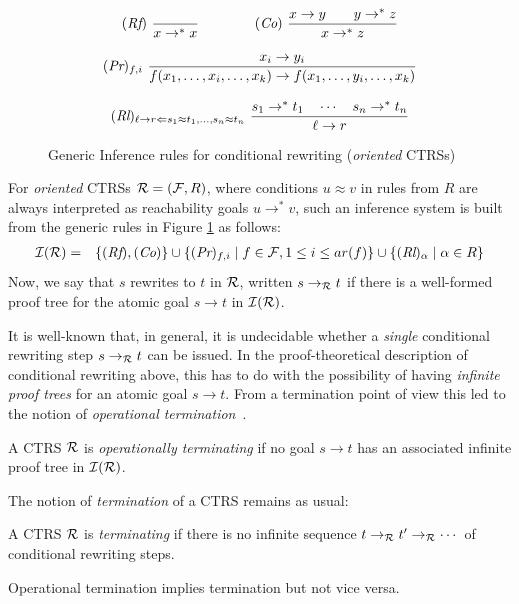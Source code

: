 %
\begin{figure}[t]
\begin{gather*}
(\emph{Rf})\ \frac{}{x \rightarrow^{\ast} x}
\qquad\qquad
(\emph{Co})\ \frac{x \rightarrow y\qquad y \rightarrow^{*} z}{x \rightarrow^{*} z}
\\[0.3cm]
(\emph{Pr})_{f,i}\ \frac{x_i \rightarrow y_i}{f(x_{1},\ldots,x_{i},\ldots,x_{k})\rightarrow f(x_{1},\ldots,y_{i},\ldots,x_{k})}
\\[0.3cm]
(\emph{Rl})_{\ell \to r \Leftarrow s_1\approx t_1,\ldots,s_n\approx t_n}\ \frac{s_1\to^*t_1\quad \cdots \quad s_n\to^*t_n}{\ell \rightarrow r}
\end{gather*}
\caption{Generic Inference rules for conditional rewriting (\emph{oriented} CTRSs)}
\label{FigInferenceRulesForConditionalRewriting}
\end{figure}
%
For \emph{oriented} CTRSs ${\cal R}=({\cal F},R)$, where conditions $u\approx v$ in rules from $R$ are always interpreted as reachability goals $u\to^*v$, such an inference system is built from the generic rules in Figure \ref{FigInferenceRulesForConditionalRewriting} as follows:
\begin{eqnarray*}
{\cal I}({\cal R}) & = & \{(\emph{Rf}),(\emph{Co})\}\cup\{(\emph{Pr})_{f,i}\mid f\in{\cal F}, 1\leq i\leq ar(f)\}\cup\{(\emph{Rl})_\alpha\mid\alpha\in R\}
\end{eqnarray*}
%
Now, we say that $s$ rewrites to $t$ in ${\cal R}$, written $s\to_{\cal R}t$ if there is a well-formed proof tree for the atomic goal $s\to t$ in 
${\cal I}({\cal R})$.

It is well-known that,  in general, it is undecidable whether a \emph{single} conditional rewriting step $s\to_{\cal R} t$ can be issued.
%
In the proof-theoretical description of conditional rewriting above, this has to do with the possibility of having \emph{infinite proof trees} for an atomic goal $s\to t$.
%
From a termination point of view this led to the notion of \emph{operational termination}~\cite{lucas2005OperationalTerminationConditional}. 
%
\begin{definition}
A CTRS ${\cal R}$ is \emph{operationally terminating} if no goal $s\to t$ has an associated infinite proof tree in ${\cal I}({\cal R})$.
\end{definition}
%
The notion of \emph{termination} of a CTRS remains as usual: 
\begin{definition}
A CTRS ${\cal R}$ is \emph{terminating} if there is no infinite sequence $t\to_{\cal R}t'\to_{\cal R}\cdots$ of conditional rewriting steps.
\end{definition}
%
Operational termination implies termination but not vice versa.

